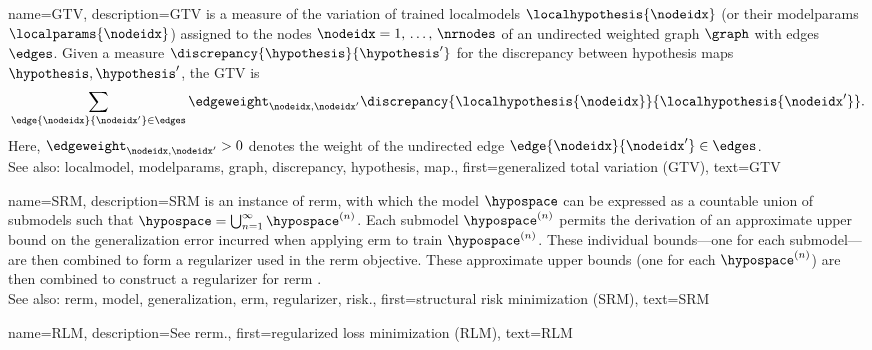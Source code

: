 	
{name={GTV}, 
	description={GTV is a 
		measure of the variation of trained \glspl{localmodel} $\localhypothesis{\nodeidx}$ 
		(or their \glspl{modelparam} $\localparams{\nodeidx}$) assigned to the nodes $\nodeidx=1, \,\ldots, \,\nrnodes$ 
		of an undirected weighted \gls{graph} $\graph$ with edges $\edges$. Given a measure $\discrepancy{\hypothesis}{\hypothesis'}$ 
		for the \gls{discrepancy} between \gls{hypothesis} \glspl{map} $\hypothesis,\hypothesis'$, the GTV is 
		\begin{equation} 
			\nonumber
			\sum_{\edge{\nodeidx}{\nodeidx'}\in \edges} \edgeweight_{\nodeidx,\nodeidx'} 
			\discrepancy{\localhypothesis{\nodeidx}}{\localhypothesis{\nodeidx'}}.
		\end{equation}
		Here, $\edgeweight_{\nodeidx,\nodeidx'}>0$ denotes the weight of the undirected edge $\edge{\nodeidx}{\nodeidx'}\in \edges$.
				\\
		See also: \gls{localmodel}, \glspl{modelparam}, \gls{graph}, \gls{discrepancy}, \gls{hypothesis}, \gls{map}.},
	first={generalized total variation (GTV)},
	text={GTV} 
}
	
{name={SRM}, 
	description={SRM is an
		instance of \gls{rerm}, with which the \gls{model} $\hypospace$ can be expressed 
		as a countable union of submodels such that $\hypospace = \bigcup_{n=1}^{\infty} \hypospace^{(n)}$. 
		Each submodel $\hypospace^{(n)}$ permits the derivation of an approximate upper bound 
		on the \gls{generalization} error incurred when applying \gls{erm} to train $\hypospace^{(n)}$. 
		These individual bounds—one for each submodel—are then combined to form a \gls{regularizer} 
		used in the \gls{rerm} objective. 
        		These approximate upper bounds (one for each $\hypospace^{(n)}$) are then combined 
		to construct a \gls{regularizer} for \gls{rerm} \cite[Sec.\ 7.2]{ShalevMLBook}.
				\\
		See also: \gls{rerm}, \gls{model}, \gls{generalization}, \gls{erm}, \gls{regularizer}, \gls{risk}.},
	first={structural risk minimization (SRM)},
	text={SRM}
 }

 {name={RLM},
 	description={See \gls{rerm}.},
	first={regularized loss minimization (RLM)}, 
 	text={RLM}
 }
 

